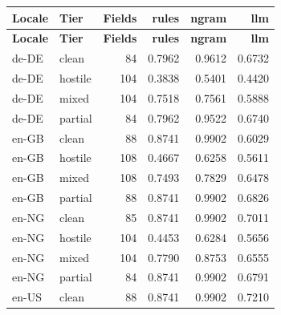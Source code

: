 \begin{longtable}{llrrrr}
\toprule
\textbf{Locale} & \textbf{Tier} & \textbf{Fields} & \textbf{rules} & \textbf{ngram} & \textbf{llm} \\
\midrule
\endfirsthead
\toprule
\textbf{Locale} & \textbf{Tier} & \textbf{Fields} & \textbf{rules} & \textbf{ngram} & \textbf{llm} \\
\midrule
\endhead
\bottomrule
\endfoot
de-DE & clean & 84 & 0.7962 & 0.9612 & 0.6732 \\  %
de-DE & hostile & 104 & 0.3838 & 0.5401 & 0.4420 \\  %
de-DE & mixed & 104 & 0.7518 & 0.7561 & 0.5888 \\  %
de-DE & partial & 84 & 0.7962 & 0.9522 & 0.6740 \\  %
en-GB & clean & 88 & 0.8741 & 0.9902 & 0.6029 \\  %
en-GB & hostile & 108 & 0.4667 & 0.6258 & 0.5611 \\  %
en-GB & mixed & 108 & 0.7493 & 0.7829 & 0.6478 \\  %
en-GB & partial & 88 & 0.8741 & 0.9902 & 0.6826 \\  %
en-NG & clean & 85 & 0.8741 & 0.9902 & 0.7011 \\  %
en-NG & hostile & 104 & 0.4453 & 0.6284 & 0.5656 \\  %
en-NG & mixed & 104 & 0.7790 & 0.8753 & 0.6555 \\  %
en-NG & partial & 84 & 0.8741 & 0.9902 & 0.6791 \\  %
en-US & clean & 88 & 0.8741 & 0.9902 & 0.7210 \\  %

\end{longtable}
